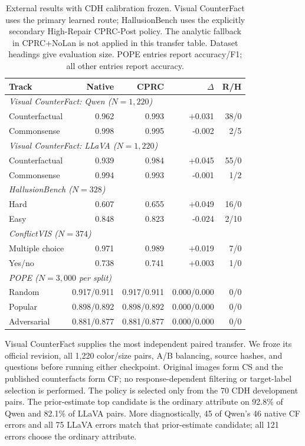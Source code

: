 \documentclass[letterpaper]{article}
\begin{document}
\begin{table}[t]
\centering
\small
\setlength{\tabcolsep}{2.2pt}
\begin{tabular}{lrrrr}
\toprule
Track & Native & CPRC & $\Delta$ & R/H \\
\midrule
\multicolumn{5}{l}{\itshape Visual CounterFact: Qwen ($N=1{,}220$)} \\
Counterfactual & 0.962 & 0.993 & +0.031 & 38/0 \\
Commonsense & 0.998 & 0.995 & -0.002 & 2/5 \\
\multicolumn{5}{l}{\itshape Visual CounterFact: LLaVA ($N=1{,}220$)} \\
Counterfactual & 0.939 & 0.984 & +0.045 & 55/0 \\
Commonsense & 0.994 & 0.993 & -0.001 & 1/2 \\
\multicolumn{5}{l}{\itshape HallusionBench ($N=328$)} \\
Hard & 0.607 & 0.655 & +0.049 & 16/0 \\
Easy & 0.848 & 0.823 & -0.024 & 2/10 \\
\multicolumn{5}{l}{\itshape ConflictVIS ($N=374$)} \\
Multiple choice & 0.971 & 0.989 & +0.019 & 7/0 \\
Yes/no & 0.738 & 0.741 & +0.003 & 1/0 \\
\multicolumn{5}{l}{\itshape POPE ($N=3{,}000$ per split)} \\
Random & 0.917/0.911 & 0.917/0.911 & 0.000/0.000 & 0/0 \\
Popular & 0.898/0.892 & 0.898/0.892 & 0.000/0.000 & 0/0 \\
Adversarial & 0.881/0.877 & 0.881/0.877 & 0.000/0.000 & 0/0 \\
\bottomrule
\end{tabular}
\caption{External results with CDH calibration frozen. Visual CounterFact uses
the primary learned route; HallusionBench uses the explicitly secondary
High-Repair CPRC-Post policy. The analytic fallback in CPRC+NoLan is not
applied in this transfer table. Dataset headings give evaluation size. POPE
entries report accuracy/F1; all other entries report accuracy.}
\label{tab:supp-transfer}
\end{table}

Visual CounterFact \cite{golovanevsky2025pixels} supplies the most independent
paired transfer. We froze its official revision, all 1,220 color/size pairs,
A/B balancing, source hashes, and questions before running either checkpoint.
Original images form CS and the published counterfacts form CF; no
response-dependent filtering or target-label selection is performed. The
policy is selected only from the 70 CDH development pairs. The prior-estimate top
candidate is the ordinary attribute on 92.8\% of Qwen
and 82.1\% of LLaVA pairs. More diagnostically, 45 of Qwen's 46 native CF errors
and all 75 LLaVA errors match that prior-estimate candidate; all 121 errors choose the
ordinary attribute.
\end{document}
